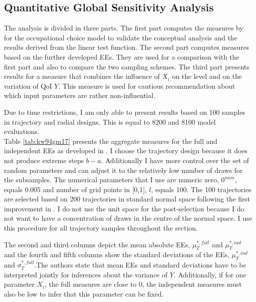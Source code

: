 \documentclass[a4paper,12pt]{article}
\begin{document}
\newpage
\subsection{Quantitative Global Sensitivity Analysis}
The analysis is divided in three parts. The first part computes the measures by \cite{ge2017extending} for the occupational choice model to validate the conceptual analysis and the results derived from the linear test function. The second part computes measures based on the further developed EEs. They are used for a comparison with the first part and also to compare the two sampling schemes. The third part presents results for a measure that combines the influence of $X_i$ on the level and on the variation of QoI $Y$. This measure is used for cautious recommendation about which input parameters are rather non-influential.

Due to time restrictions, I am only able to present results based on 100 samples in trajectory and radial designs. This is equal to 8200 and 8100 model evaluations.\\

\noindent
Table \ref{tab:kw94gm17} presents the aggregate measures for the full and independent EEs as developed in \cite{ge2014efficient}. I choose the trajectory design because it does not produce extreme steps $b-a$. Additionally I have more control over the set of random parameters and can adjust it to the relatively low number of draws for the subsamples. The numerical parameters that I use are numeric zero, $0^{num}$, equals 0.005 and number of grid points in [0,1], $l$, equals 100. The 100 trajectories are selected based on 200 trajectories in standard normal space following the first improvement in \cite{ge2014efficient}. I do not use the unit space for the post-selection because I do not want to have a concentration of draws in the centre of the normal space. I use this procedure for all trajectory samples throughout the section.

The second and third columns depict the mean absolute EEs, $\mu^{*,full}_T$ and $\mu^{*,ind}_T$ and the fourth and fifth columns show the standard deviations of the EEs, $\mu^{*,ind}_T$ and $\sigma^{*,full}_T$.The authors state that mean EEs and standard deviations have to be interpreted jointly for inferences about the variance of $Y$. Additionally, if for one parameter $X_i$, the full measures are close to 0, the independent measures must also be low to infer that this parameter can be fixed.
\end{document}

